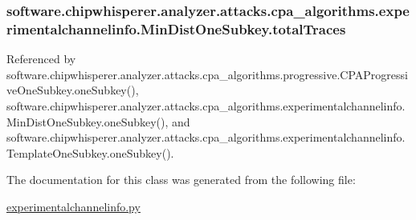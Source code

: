 \subsubsection[{total\+Traces}]{\setlength{\rightskip}{0pt plus 5cm}software.\+chipwhisperer.\+analyzer.\+attacks.\+cpa\+\_\+algorithms.\+experimentalchannelinfo.\+Min\+Dist\+One\+Subkey.\+total\+Traces}\label{classsoftware_1_1chipwhisperer_1_1analyzer_1_1attacks_1_1cpa__algorithms_1_1experimentalchannelinfo_1_1MinDistOneSubkey_abbc316bb21caa52a556a2bf1b7c82eca}


Referenced by software.\+chipwhisperer.\+analyzer.\+attacks.\+cpa\+\_\+algorithms.\+progressive.\+C\+P\+A\+Progressive\+One\+Subkey.\+one\+Subkey(), software.\+chipwhisperer.\+analyzer.\+attacks.\+cpa\+\_\+algorithms.\+experimentalchannelinfo.\+Min\+Dist\+One\+Subkey.\+one\+Subkey(), and software.\+chipwhisperer.\+analyzer.\+attacks.\+cpa\+\_\+algorithms.\+experimentalchannelinfo.\+Template\+One\+Subkey.\+one\+Subkey().



The documentation for this class was generated from the following file\+:\begin{DoxyCompactItemize}
\item 
\hyperlink{experimentalchannelinfo_8py}{experimentalchannelinfo.\+py}\end{DoxyCompactItemize}
